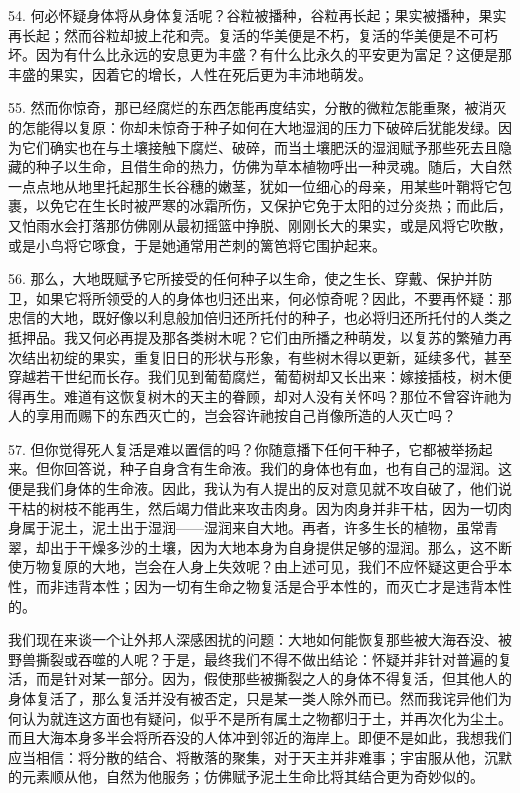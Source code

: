 54. 何必怀疑身体将从身体复活呢？谷粒被播种，谷粒再长起；果实被播种，果实再长起；然而谷粒却披上花和壳。复活的华美便是不朽，复活的华美便是不可朽坏。因为有什么比永远的安息更为丰盛？有什么比永久的平安更为富足？这便是那丰盛的果实，因着它的增长，人性在死后更为丰沛地萌发。\par

55. 然而你惊奇，那已经腐烂的东西怎能再度结实，分散的微粒怎能重聚，被消灭的怎能得以复原：你却未惊奇于种子如何在大地湿润的压力下破碎后犹能发绿。因为它们确实也在与土壤接触下腐烂、破碎，而当土壤肥沃的湿润赋予那些死去且隐藏的种子以生命，且借生命的热力，仿佛为草本植物呼出一种灵魂。随后，大自然一点点地从地里托起那生长谷穗的嫩茎，犹如一位细心的母亲，用某些叶鞘将它包裹，以免它在生长时被严寒的冰霜所伤，又保护它免于太阳的过分炎热；而此后，又怕雨水会打落那仿佛刚从最初摇篮中挣脱、刚刚长大的果实，或是风将它吹散，或是小鸟将它啄食，于是她通常用芒刺的篱笆将它围护起来。\par

56. 那么，大地既赋予它所接受的任何种子以生命，使之生长、穿戴、保护并防卫，如果它将所领受的人的身体也归还出来，何必惊奇呢？因此，不要再怀疑：那忠信的大地，既好像以利息般加倍归还所托付的种子，也必将归还所托付的人类之抵押品。我又何必再提及那各类树木呢？它们由所播之种萌发，以复苏的繁殖力再次结出初绽的果实，重复旧日的形状与形象，有些树木得以更新，延续多代，甚至穿越若干世纪而长存。我们见到葡萄腐烂，葡萄树却又长出来：嫁接插枝，树木便得再生。难道有这恢复树木的天主的眷顾，却对人没有关怀吗？那位不曾容许祂为人的享用而赐下的东西灭亡的，岂会容许祂按自己肖像所造的人灭亡吗？\par

57. 但你觉得死人复活是难以置信的吗？你随意播下任何干种子，它都被举扬起来。但你回答说，种子自身含有生命液。我们的身体也有血，也有自己的湿润。这便是我们身体的生命液。因此，我认为有人提出的反对意见就不攻自破了，他们说干枯的树枝不能再生，然后竭力借此来攻击肉身。因为肉身并非干枯，因为一切肉身属于泥土，泥土出于湿润——湿润来自大地。再者，许多生长的植物，虽常青翠，却出于干燥多沙的土壤，因为大地本身为自身提供足够的湿润。那么，这不断使万物复原的大地，岂会在人身上失效呢？由上述可见，我们不应怀疑这更合乎本性，而非违背本性；因为一切有生命之物复活是合乎本性的，而灭亡才是违背本性的。\par

我们现在来谈一个让外邦人深感困扰的问题：大地如何能恢复那些被大海吞没、被野兽撕裂或吞噬的人呢？于是，最终我们不得不做出结论：怀疑并非针对普遍的复活，而是针对某一部分。因为，假使那些被撕裂之人的身体不得复活，但其他人的身体复活了，那么复活并没有被否定，只是某一类人除外而已。然而我诧异他们为何认为就连这方面也有疑问，似乎不是所有属土之物都归于土，并再次化为尘土。而且大海本身多半会将所吞没的人体冲到邻近的海岸上。即便不是如此，我想我们应当相信：将分散的结合、将散落的聚集，对于天主并非难事；宇宙服从他，沉默的元素顺从他，自然为他服务；仿佛赋予泥土生命比将其结合更为奇妙似的。\par

